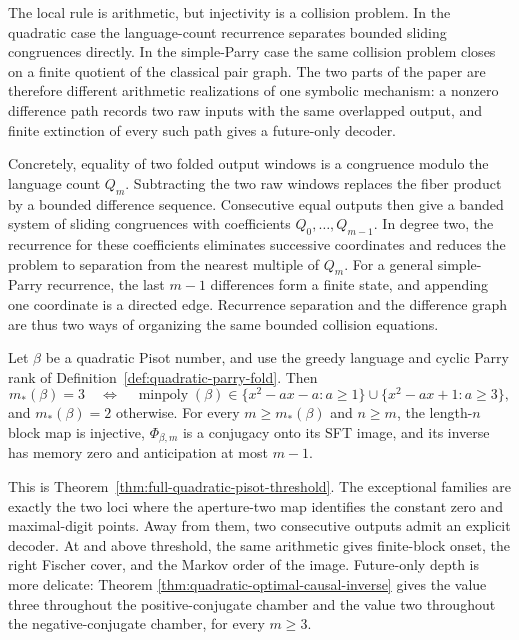 The local rule is arithmetic, but injectivity is a collision problem.  In
the quadratic case the language-count recurrence separates bounded sliding
congruences directly.  In the simple-Parry case the same collision problem
closes on a finite quotient of the classical pair graph.  The two parts of
the paper are therefore different arithmetic realizations of one symbolic
mechanism: a nonzero difference path records two raw inputs with the same
overlapped output, and finite extinction of every such path gives a
future-only decoder.

Concretely, equality of two folded output windows is a congruence modulo the
language count $Q_m$.  Subtracting the two raw windows replaces the fiber
product by a bounded difference sequence.  Consecutive equal outputs then
give a banded system of sliding congruences with coefficients
$Q_0,\ldots,Q_{m-1}$.  In degree two, the recurrence for these coefficients
eliminates successive coordinates and reduces the problem to separation from
the nearest multiple of $Q_m$.  For a general simple-Parry recurrence, the
last $m-1$ differences form a finite state, and appending one coordinate is a
directed edge.  Recurrence separation and the difference graph are thus two
ways of organizing the same bounded collision equations.

\begin{introtheorem}
Let $\beta$ be a quadratic Pisot number, and use the greedy language and
cyclic Parry rank of Definition~\ref{def:quadratic-parry-fold}.  Then
\[
m_*(\beta)=3
\quad\Longleftrightarrow\quad
\operatorname{minpoly}(\beta)\in
\{x^2-ax-a:a\ge1\}\cup\{x^2-ax+1:a\ge3\},
\]
and $m_*(\beta)=2$ otherwise.  For every $m\ge m_*(\beta)$ and $n\ge m$,
the length-$n$ block map is injective, $\Phi_{\beta,m}$ is a conjugacy onto
its SFT image, and its inverse has memory zero and anticipation at most
$m-1$.
\end{introtheorem}

This is Theorem~\ref{thm:full-quadratic-pisot-threshold}.  The exceptional
families are exactly the two loci where the aperture-two map identifies the
constant zero and maximal-digit points.  Away from them, two consecutive
outputs admit an explicit decoder.  At and above threshold, the same
arithmetic gives finite-block onset, the right Fischer cover, and the Markov
order of the image.  Future-only depth is more delicate: Theorem
\ref{thm:quadratic-optimal-causal-inverse} gives the value three throughout
the positive-conjugate chamber and the value two throughout the
negative-conjugate chamber, for every $m\ge3$.

